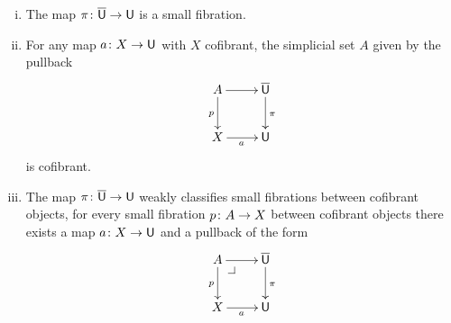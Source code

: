\documentclass[reqno,10pt,a4paper,oneside,draft]{amsart}
\begin{document}
\begin{proposition} \label{thm:universe-u}  \hfill 
\begin{enumerate}[(i)] 
\item The map $\pi \colon \overline{\mathsf{U}} \to \mathsf{U}$ is a small fibration.
\item For any map $a \colon X \rightarrow \mathsf{U}$ with $X$ cofibrant, the 
simplicial set $A$ given by the pullback
\[
\xymatrix{
A \ar[r] \ar[d]_p & \UU \ar[d]^\pi \\
X \ar[r]_a & \U }
\]
is cofibrant.
\item The map $\pi \colon \overline{\mathsf{U}} \to \mathsf{U}$ weakly classifies small fibrations between cofibrant objects, \ie 
for every small fibration $p \colon A \to X$ between cofibrant objects there exists a map 
$a \colon X \to \mathsf{U}$ and a pullback  of the form
\[
\xymatrix{
A \ar[r] \ar[d]_p \drpullback & \UU \ar[d]^\pi \\
X \ar[r]_{a} & \U }
\]
\end{enumerate}
\end{proposition}
\end{document}
